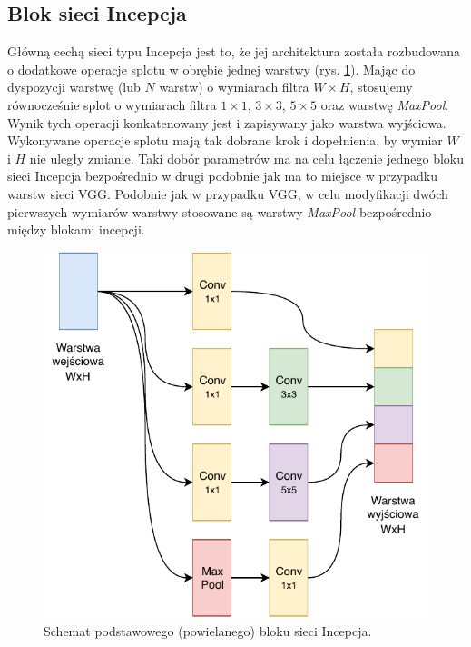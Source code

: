 \subsection{Blok sieci Incepcja}
\label{subsection:inception-block}
Główną cechą sieci typu Incepcja jest to, że jej architektura została rozbudowana o dodatkowe operacje splotu w obrębie jednej warstwy (rys. \ref{fig:inception-block}).
Mając do dyspozycji warstwę (lub \(N\) warstw) o wymiarach filtra \(W \times H\), stosujemy równocześnie splot o wymiarach filtra \(1 \times 1\), \(3 \times 3\), \(5 \times 5\) oraz warstwę \textit{MaxPool}. 
Wynik tych operacji konkatenowany jest i zapisywany jako warstwa wyjściowa. Wykonywane operacje splotu mają tak dobrane krok i dopełnienia, by wymiar \(W\) i \(H\) nie uległy zmianie. 
Taki dobór parametrów ma na celu łączenie jednego bloku sieci Incepcja bezpośrednio w drugi podobnie jak ma to miejsce w przypadku warstw sieci VGG. 
Podobnie jak w przypadku VGG, w celu modyfikacji dwóch pierwszych wymiarów warstwy stosowane są warstwy \textit{MaxPool} bezpośrednio między blokami incepcji.

\begin{figure}[ht]
\centerline{\includegraphics[scale=1]{resources/Inception_block.pdf}}
\caption{Schemat podstawowego (powielanego) bloku sieci Incepcja.}
\label{fig:inception-block}
\end{figure}

